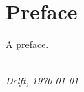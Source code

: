 \chapter*{Preface}

A preface.

\begin{flushright}
{\makeatletter\itshape
    \@author \\
    Delft, \monthyeardate\today
\makeatother}
\end{flushright}